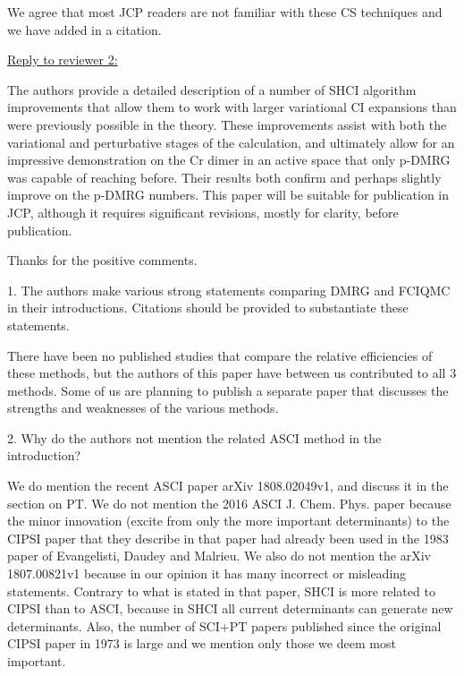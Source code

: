 \documentclass[
preprint,
onecolumn,
 superscriptaddress,
 amsmath,amssymb,
 aps,
]{revtex4-1}
\begin{document}
We agree that most JCP readers are not familiar with these CS techniques and we have added in
a citation.

\vskip 8mm
\noindent\underline{Reply to reviewer 2:}

\vskip 5mm {\color{blue}
The authors provide a detailed description of a number of SHCI algorithm improvements that
allow them to work with larger variational CI expansions than were previously possible in the
theory. These improvements assist with both the variational and perturbative stages of the
calculation, and ultimately allow for an impressive demonstration on the Cr dimer in an active
space that only p-DMRG was capable of reaching before. Their results both confirm and perhaps
slightly improve on the p-DMRG numbers. This paper will be suitable for publication in JCP,
although it requires significant revisions, mostly for clarity, before publication.
}\color{black}

Thanks for the positive comments.

\vskip 5mm {\color{blue}
1. The authors make various strong statements comparing DMRG and FCIQMC in their
introductions. Citations should be provided to substantiate these statements.
}\color{black}

There have been no published studies that compare the relative efficiencies of these methods,
but the authors of this paper have
between us contributed to all 3 methods.  Some of us are planning to publish a separate paper
that discusses the strengths and weaknesses
of the various methods.

\vskip 5mm {\color{blue}
2. Why do the authors not mention the related ASCI method in the introduction?
}\color{black}

We do mention the recent ASCI paper arXiv 1808.02049v1, and discuss it in the section on PT.
We do not mention the 2016 ASCI J. Chem. Phys. paper because the minor innovation (excite from
only the more important determinants) to the CIPSI paper that they
describe in that paper had already been used in the 1983 paper of Evangelisti, Daudey and Malrieu.
We also do not mention the arXiv 1807.00821v1 because in our opinion it has many incorrect or
misleading statements.  Contrary to what is stated in that paper, SHCI is more related to CIPSI
than to ASCI, because in SHCI all current determinants can generate new determinants.
Also, the number of SCI+PT papers published since the original CIPSI paper in 1973 is large and we
mention only those we deem most important.
\end{document}
